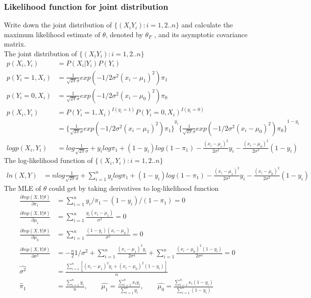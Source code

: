 \documentclass[11pt]{article} %
\begin{document}
\subsubsection{Likelihood function for joint distribution}
	Write down the joint distribution of $\{(X_i Y_i): i=1,2..n \}$ and calculate the
	maximum likelihood estimate of $\theta$, denoted by $\theta_F$ , and its asymptotic covariance
	matrix.\\
	The joint distribution of $\{(X_i Y_i): i=1,2..n \}$
	\begin{align*}
		p(X_i, Y_i) &= P(X_i|Y_i) P(Y_i) \\
		p(Y_i=1, X_i) &= \frac{1}{\sqrt{2\pi}\sigma} exp(-1/2\sigma^2 (x_i-\mu_1)^2) \pi_1\\
		p(Y_i=0, X_i) &=\frac{1}{\sqrt{2\pi}\sigma} exp(-1/2\sigma^2 (x_i-\mu_0)^2)  \pi_0\\
		p(X_i, Y_i) &= P(Y_i=1, X_i)^{I(y_i=1)} P(Y_i=0, X_i)^{I(y_i=0)}\\
		& = {\{\frac{1}{\sqrt{2\pi}\sigma} exp(-1/2\sigma^2 (x_i-\mu_1)^2) \pi_1\}}^{y_i} {\{\frac{1}{\sqrt{2\pi}\sigma} exp(-1/2\sigma^2 (x_i-\mu_0)^2)  \pi_0\}}^{1-y_i}\\
		log p(X_i, Y_i) &= log \frac{1}{\sqrt{2\pi}\sigma} + y_i log\pi_1 + (1-y_i) log(1-\pi_1) - \frac{(x_i-\mu_i)^2}{2\sigma^2} y_i - \frac{(x_i-\mu_0)^2}{2\sigma^2} (1-y_i)
	\end{align*} 
	The log-likelihood function of $\{(X_i, Y_i): i=1,2..n \}$
	\begin{align*}
		ln(X, Y) &= nlog \frac{1}{\sqrt{2\pi}\sigma} + \sum_{i=1}^n y_i log\pi_1 + (1-y_i) log(1-\pi_1) - \frac{(x_i-\mu_1)^2}{2\sigma^2} y_i - \frac{(x_i-\mu_0)^2}{2\sigma^2} (1-y_i)
	\end{align*} 
	The MLE of $\theta$ could get by taking derivatives to log-likelihood function
	\begin{align*}
		\frac{\partial ln p(X, Y|\theta)}{\partial \pi_1}  &= \sum_{i=1}^n y_i/\pi_1 - (1-y_i)/(1-\pi_1)=0\\
		\frac{\partial ln p(X, Y|\theta)}{\partial \mu_1}  &= \sum_{i=1}^n \frac{y_i(x_i-\mu_1)}{\sigma^2}=0     \\
		\frac{\partial ln p(X, Y|\theta)}{\partial \mu_0}  &= \sum_{i=1}^n \frac{(1-y_i)(x_i-\mu_0)}{\sigma^2}=0\\
		\frac{\partial ln p(X, Y|\theta)}{\partial \sigma^2}  &= -\frac{n}{2}{1/\sigma^2} + \sum_{i=1}^n \frac{(x_i-\mu_1)^2y_i}{2\sigma^4} + \sum_{i=1}^n \frac{(x_i-\mu_0)^2(1-y_i)}{2\sigma^4} = 0\\
		\hat{\sigma^2} &= \frac{\sum_{i=1}^n [(x_i-\mu_1)^2y_i + (x_i-\mu_0)^2(1-y_i)]}{n}\\
		\hat\pi_1 &= \frac{\sum_{i=1}^n y_i}{n}, \qquad \hat{\mu_1} =  \frac{\sum_{i=1}^n x_iy_i}{\sum_{i=1}^n y_i}, \qquad \hat{\mu_0} =  \frac{\sum_{i=1}^n x_i(1-y_i)}{\sum_{i=1}^n (1-y_i)}
	\end{align*} 
\end{document}
